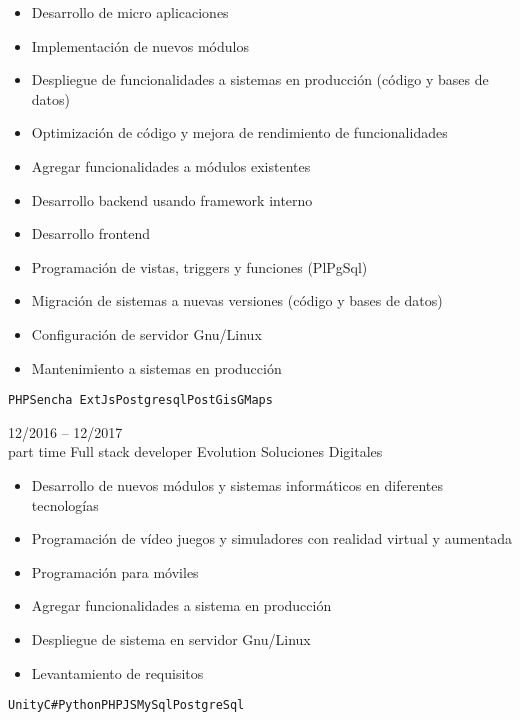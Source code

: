 \begin{entrylist}
{\begin{itemize}
    	        \setlength\parskip{0pt}
    	        \item Desarrollo de micro aplicaciones
    	        \item Implementación de nuevos módulos
    	        \item Despliegue de funcionalidades a sistemas en producción (código y bases de datos)
    	        \item Optimización de código y mejora de rendimiento de funcionalidades
    	        \item Agregar funcionalidades a módulos existentes
    	        \item Desarrollo backend usando framework interno
    	        \item Desarrollo frontend
    	        \item Programación de vistas, triggers y funciones (PlPgSql)
    	        \item Migración de sistemas a nuevas versiones (código y bases de datos)
    	        \item Configuración de servidor Gnu/Linux
    	        \item Mantenimiento a sistemas en producción
    	    \end{itemize}
		    \texttt{PHP}\slashsep\texttt{Sencha ExtJs}\slashsep\texttt{Postgresql}\slashsep\texttt{PostGis}\slashsep\texttt{GMaps}
        }
	\entry
		{12/2016 -- 12/2017\\\footnotesize{part time}}
		{Full stack developer}
		{Evolution Soluciones Digitales}
		{
		    \vspace{-5mm}
    	    \begin{itemize}
    	        \setlength\itemsep{0pt}
    	        \setlength\parskip{0pt}
    	        \item Desarrollo de nuevos módulos y sistemas informáticos en diferentes tecnologías
    	        \item Programación de vídeo juegos y simuladores con realidad virtual y aumentada
    	        \item Programación para móviles
    	        \item Agregar funcionalidades a sistema en producción
    	        \item Despliegue de sistema en servidor Gnu/Linux
    	        \item Levantamiento de requisitos
    	    \end{itemize}\texttt{Unity}\slashsep\texttt{C\#}\slashsep\texttt{Python}\slashsep\texttt{PHP}\slashsep\texttt{JS}\slashsep\texttt{MySql}\slashsep\texttt{PostgreSql}
}
\end{entrylist}
